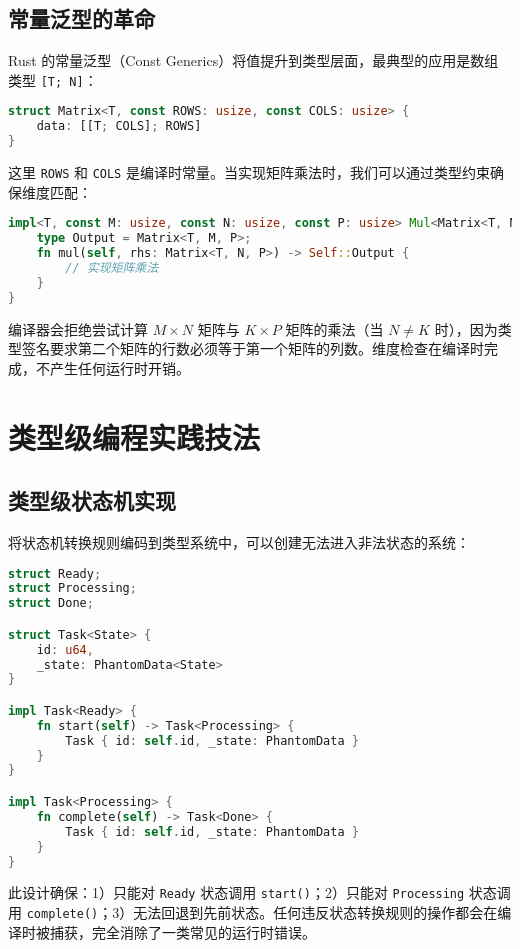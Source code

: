 \section{常量泛型的革命}
Rust 的常量泛型（Const Generics）将值提升到类型层面，最典型的应用是数组类型 \texttt{[T; N]}：\par
\begin{lstlisting}[language=rust]
struct Matrix<T, const ROWS: usize, const COLS: usize> {
    data: [[T; COLS]; ROWS]
}
\end{lstlisting}
这里 \texttt{ROWS} 和 \texttt{COLS} 是编译时常量。当实现矩阵乘法时，我们可以通过类型约束确保维度匹配：\par
\begin{lstlisting}[language=rust]
impl<T, const M: usize, const N: usize, const P: usize> Mul<Matrix<T, N, P>> for Matrix<T, M, N> {
    type Output = Matrix<T, M, P>;
    fn mul(self, rhs: Matrix<T, N, P>) -> Self::Output {
        // 实现矩阵乘法
    }
}
\end{lstlisting}
编译器会拒绝尝试计算 $M \times N$ 矩阵与 $K \times P$ 矩阵的乘法（当 $N \neq K$ 时），因为类型签名要求第二个矩阵的行数必须等于第一个矩阵的列数。维度检查在编译时完成，不产生任何运行时开销。\par
\chapter{类型级编程实践技法}
\section{类型级状态机实现}
将状态机转换规则编码到类型系统中，可以创建无法进入非法状态的系统：\par
\begin{lstlisting}[language=rust]
struct Ready;
struct Processing;
struct Done;

struct Task<State> {
    id: u64,
    _state: PhantomData<State>
}

impl Task<Ready> {
    fn start(self) -> Task<Processing> {
        Task { id: self.id, _state: PhantomData }
    }
}

impl Task<Processing> {
    fn complete(self) -> Task<Done> {
        Task { id: self.id, _state: PhantomData }
    }
}
\end{lstlisting}
此设计确保：1）只能对 \texttt{Ready} 状态调用 \texttt{start()}；2）只能对 \texttt{Processing} 状态调用 \texttt{complete()}；3）无法回退到先前状态。任何违反状态转换规则的操作都会在编译时被捕获，完全消除了一类常见的运行时错误。\par
